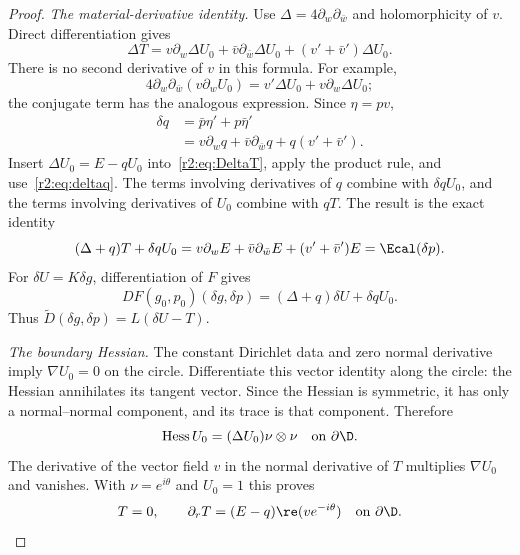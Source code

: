 \begin{proof}
\emph{The material-derivative identity.}
Use $\Delta=4\partial_w\partial_{\bar w}$ and holomorphicity of $v$. Direct differentiation gives
\begin{equation}\label{r2:eq:DeltaT}
 \Delta T=v\partial_w\Delta U_0+\bar v\partial_{\bar w}\Delta U_0
          +(v'+\bar v')\Delta U_0.
\end{equation}
There is no second derivative of $v$ in this formula. For example,
\[
 4\partial_w\partial_{\bar w}(v\partial_wU_0)
 =v'\Delta U_0+v\partial_w\Delta U_0;
\]
the conjugate term has the analogous expression. Since $\eta=pv$,
\begin{equation}\label{r2:eq:deltaq}
 \begin{split}
 \delta q&=\bar p\eta'+p\bar\eta'\\
 &=v\partial_wq+\bar v\partial_{\bar w}q+q(v'+\bar v').
 \end{split}
\end{equation}
Insert $\Delta U_0=E-qU_0$ into~\eqref{r2:eq:DeltaT}, apply the product rule, and use~\eqref{r2:eq:deltaq}. The terms involving derivatives of $q$ combine with $\delta qU_0$, and the terms involving derivatives of $U_0$ combine with $qT$. The result is the exact identity
\begin{equation}\label{r2:eq:material}
 (\Delta+q)T+\delta qU_0
 =v\partial_wE+\bar v\partial_{\bar w}E+(v'+\bar v')E
 =\Ecal(\delta p).
\end{equation}
For $\delta U=K\delta g$, differentiation of $F$ gives
\begin{equation}\label{r2:eq:DF}
 DF(g_0,p_0)(\delta g,\delta p)
 =(\Delta+q)\delta U+\delta qU_0.
\end{equation}
Thus $\widetilde D(\delta g,\delta p)=L(\delta U-T)$.

\emph{The boundary Hessian.}
The constant Dirichlet data and zero normal derivative imply $\nabla U_0=0$ on the circle. Differentiate this vector identity along the circle: the Hessian annihilates its tangent vector. Since the Hessian is symmetric, it has only a normal--normal component, and its trace is that component. Therefore
\[
 \operatorname{Hess}U_0=(\Delta U_0)\nu\otimes\nu
 \quad\text{on }\partial\D.
\]
The derivative of the vector field $v$ in the normal derivative of $T$ multiplies $\nabla U_0$ and vanishes. With $\nu=e^{i\theta}$ and $U_0=1$ this proves
\begin{equation}\label{r2:eq:T-boundary}
 T=0,\qquad
 \partial_rT=(E-q)\re(ve^{-i\theta})
 \quad\text{on }\partial\D.
\end{equation}


\end{proof}
